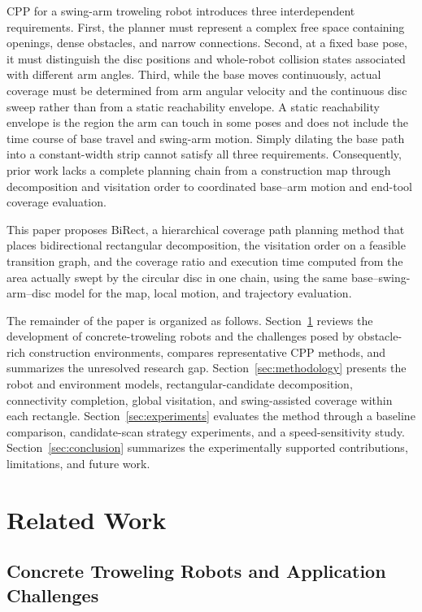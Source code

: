 CPP for a swing-arm troweling robot introduces three interdependent requirements. First, the planner must represent a complex free space containing openings, dense obstacles, and narrow connections. Second, at a fixed base pose, it must distinguish the disc positions and whole-robot collision states associated with different arm angles. Third, while the base moves continuously, actual coverage must be determined from arm angular velocity and the continuous disc sweep rather than from a static reachability envelope. A static reachability envelope is the region the arm can touch in some poses and does not include the time course of base travel and swing-arm motion. Simply dilating the base path into a constant-width strip cannot satisfy all three requirements. Consequently, prior work lacks a complete planning chain from a construction map through decomposition and visitation order to coordinated base--arm motion and end-tool coverage evaluation.

This paper proposes BiRect, a hierarchical coverage path planning method that places bidirectional rectangular decomposition, the visitation order on a feasible transition graph, and the coverage ratio and execution time computed from the area actually swept by the circular disc in one chain, using the same base--swing-arm--disc model for the map, local motion, and trajectory evaluation.

The remainder of the paper is organized as follows. Section~\ref{sec:related-work} reviews the development of concrete-troweling robots and the challenges posed by obstacle-rich construction environments, compares representative CPP methods, and summarizes the unresolved research gap. Section~\ref{sec:methodology} presents the robot and environment models, rectangular-candidate decomposition, connectivity completion, global visitation, and swing-assisted coverage within each rectangle. Section~\ref{sec:experiments} evaluates the method through a baseline comparison, candidate-scan strategy experiments, and a speed-sensitivity study. Section~\ref{sec:conclusion} summarizes the experimentally supported contributions, limitations, and future work.

\section{Related Work}
\label{sec:related-work}

\subsection{Concrete Troweling Robots and Application Challenges}

